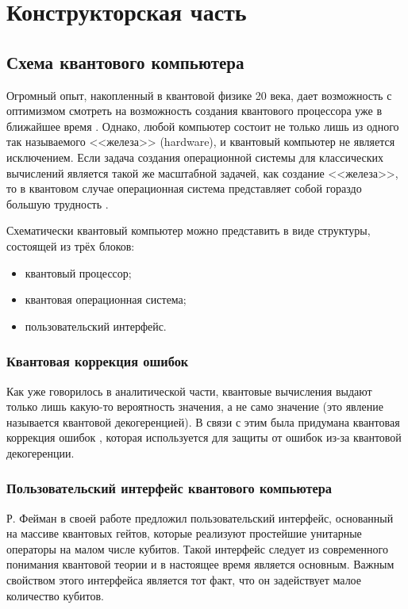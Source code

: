 \chapter{Конструкторская часть}

\section{Схема квантового компьютера}

Огромный опыт, накопленный в квантовой физике 20 века, дает возможность с оптимизмом смотреть на возможность создания квантового процессора уже в ближайшее время \cite{quantum-computer}. Однако, любой компьютер состоит не только лишь из одного так называемого <<железа>> (hardware), и квантовый компьютер не является исключением. Если задача создания операционной системы для классических вычислений является такой же масштабной задачей, как создание <<железа>>, то в квантовом случае операционная система представляет собой гораздо большую трудность \cite{quantum-computer}.

Схематически квантовый компьютер можно представить в виде структуры, состоящей из трёх блоков:

\begin{itemize}
	\item квантовый процессор;
	\item квантовая операционная система;
	\item пользовательский интерфейс.
\end{itemize}

\subsection{Квантовая коррекция ошибок}
Как уже говорилось в аналитической части, квантовые вычисления выдают только лишь какую-то вероятность значения, а не само значение (это явление называется квантовой декогеренцией). В связи с этим была придумана квантовая коррекция ошибок \cite{quantum-codes}, которая используется для защиты от ошибок из-за квантовой декогеренции. 

\subsection{Пользовательский интерфейс квантового компьютера}

Р. Фейман в своей работе \cite{feynman} предложил пользовательский интерфейс, основанный на массиве квантовых гейтов, которые реализуют простейшие унитарные операторы на малом числе кубитов. Такой интерфейс следует из современного понимания квантовой теории \cite{quantum-computer} и в настоящее время является основным. Важным свойством этого интерфейса является тот факт, что он задействует малое количество кубитов.

